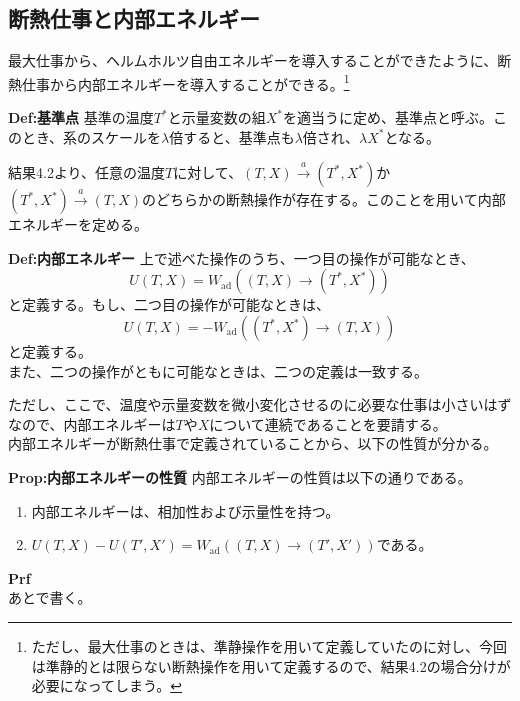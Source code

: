 \documentclass[a4paper,11pt]{jsarticle}
\begin{document}
\subsection{断熱仕事と内部エネルギー}
最大仕事から、ヘルムホルツ自由エネルギーを導入することができたように、断熱仕事から内部エネルギーを導入することができる。\footnote{ただし、最大仕事のときは、準静操作を用いて定義していたのに対し、今回は準静的とは限らない断熱操作を用いて定義するので、結果4.2の場合分けが必要になってしまう。}\\
\begin{itembox}[l]{\textbf{Def:基準点}}
    基準の温度$T^*$と示量変数の組$X^*$を適当うに定め、基準点と呼ぶ。このとき、系のスケールを$\lambda$倍すると、基準点も$\lambda$倍され、$\lambda X^*$となる。
\end{itembox}
結果4.2より、任意の温度$T$に対して、$(T,X)\xrightarrow{a} (T^*,X^*)$か$(T^*,X^*)\xrightarrow{a} (T,X)$のどちらかの断熱操作が存在する。このことを用いて内部エネルギーを定める。\\
\begin{itembox}[l]{\textbf{Def:内部エネルギー}}
上で述べた操作のうち、一つ目の操作が可能なとき、
\begin{equation}
    U(T,X) = W_{\text{ad}}((T,X)\rightarrow (T^*,X^*))
\end{equation}
と定義する。もし、二つ目の操作が可能なときは、
\begin{equation}
    U(T,X) = -W_{\text{ad}}((T^*,X^*)\rightarrow (T,X))
\end{equation}
と定義する。\\
また、二つの操作がともに可能なときは、二つの定義は一致する。
\end{itembox}
ただし、ここで、温度や示量変数を微小変化させるのに必要な仕事は小さいはずなので、内部エネルギーは$T$や$X$について連続であることを要請する。\\
内部エネルギーが断熱仕事で定義されていることから、以下の性質が分かる。\\
\begin{itembox}[l]{\textbf{Prop:内部エネルギーの性質}}
    内部エネルギーの性質は以下の通りである。
    \begin{enumerate}
        \item 内部エネルギーは、相加性および示量性を持つ。
        \item $U(T,X)-U(T',X') = W_{\text{ad}}((T,X)\rightarrow (T',X'))$である。
    \end{enumerate}
\end{itembox}
\textbf{Prf}\\
あとで書く。\\
\end{document}
